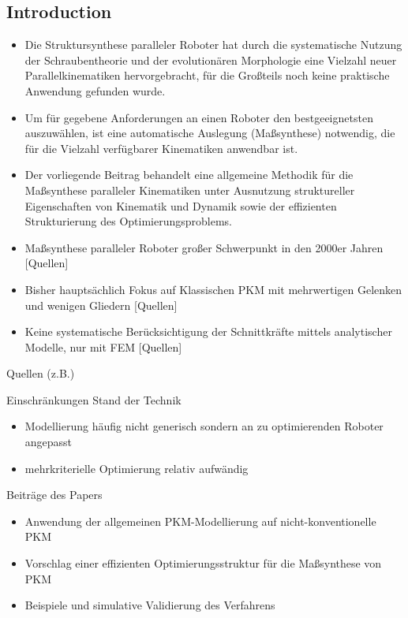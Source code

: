 \documentclass[fleqn,a4paper,10pt]{article}
\begin{document}
\vspace{18pt} %


\begin{multicols}{2}

\section{Introduction}

\begin{itemize}
\item Die Struktursynthese paralleler Roboter hat durch die systematische Nutzung der Schraubentheorie \cite{KongGos2007} und der evolutionären Morphologie \cite{Gogu2008} eine Vielzahl neuer Parallelkinematiken hervorgebracht, für die Großteils noch keine praktische Anwendung gefunden wurde.
\item Um für gegebene Anforderungen an einen Roboter den bestgeeignetsten auszuwählen, ist eine automatische Auslegung (Maßsynthese) notwendig, die für die Vielzahl verfügbarer Kinematiken anwendbar ist.
\item Der vorliegende Beitrag behandelt eine allgemeine Methodik für die Maßsynthese paralleler Kinematiken unter Ausnutzung struktureller Eigenschaften von Kinematik und Dynamik sowie der effizienten Strukturierung des Optimierungsproblems.
\item Maßsynthese paralleler Roboter großer Schwerpunkt in den 2000er Jahren [Quellen]
\item Bisher hauptsächlich Fokus auf Klassischen PKM mit mehrwertigen Gelenken und wenigen Gliedern [Quellen]
\item Keine systematische Berücksichtigung der Schnittkräfte mittels analytischer Modelle, nur mit FEM [Quellen]
\end{itemize}

Quellen (z.B.)
\cite{JamwalHusXie2015}
\cite{Krefft2006}
\cite{CarboneOttCec2007}
\cite{ZhouBaiHan2011}

Einschränkungen Stand der Technik
\begin{itemize}
\item Modellierung häufig nicht generisch sondern an zu optimierenden Roboter angepasst
\item mehrkriterielle Optimierung relativ aufwändig
\end{itemize}

Beiträge des Papers
\begin{itemize}
\item Anwendung der allgemeinen PKM-Modellierung auf nicht-konventionelle PKM
\item Vorschlag einer effizienten Optimierungsstruktur für die Maßsynthese von PKM
\item Beispiele und simulative Validierung des Verfahrens
\end{itemize}


\end{multicols}
\end{document}
